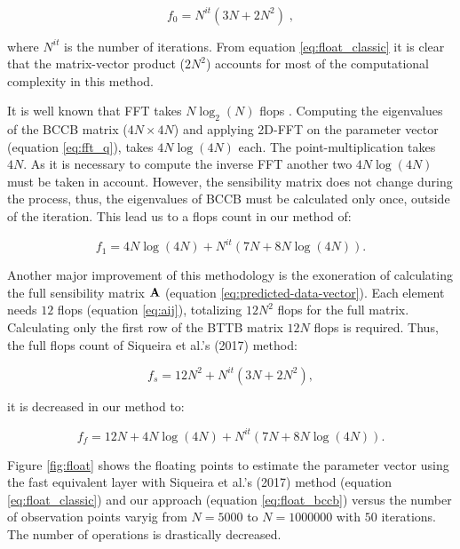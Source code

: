 \documentclass[paper]{geophysics}
\begin{document}
\begin{equation}
f_0 = N^{it} (3N + 2N^2) \; ,
\label{eq:float_classic}
\end{equation}

\noindent where $N^{it}$ is the number of iterations. From equation \ref{eq:float_classic} it is clear that the matrix-vector product ($2N^2$) accounts for most of the computational complexity in this method.

It is well known that FFT takes $N \log_2(N)$ flops \cite[]{brigham1988fast}. Computing the eigenvalues of the BCCB matrix ($4N \times 4N$) and applying 2D-FFT on the parameter vector (equation \ref{eq:fft_q}), takes $4N \log(4N)$ each. The point-multiplication takes $4N$. As it is necessary to compute the inverse FFT another two $4N \log(4N)$ must be taken in account. However, the sensibility matrix does not change during the process, thus, the eigenvalues of BCCB must be calculated only once, outside of the iteration. This lead us to a flops count in our method of:

\begin{equation}
f_1 = 4N\log(4N) + N^{it} (7N + 8N\log(4N)).
\label{eq:float_bccb}
\end{equation}

Another major improvement of this methodology is the exoneration of calculating the full sensibility matrix $\tensor{A}$ (equation \ref{eq:predicted-data-vector}). Each element needs $12$ flops (equation \ref{eq:aij}), totalizing $12N^2$ flops for the full matrix. Calculating only the first row of the BTTB matrix $12N$ flops is required.
Thus, the full flops count of Siqueira et al.'s (2017) method:

\begin{equation}
f_s = 12N^2 + N^{it} (3N + 2N^2),
\label{eq:float_siqueira}
\end{equation}

it is decreased in our method to:

\begin{equation}
f_f = 12N + 4N \log(4N) + N^{it} (7N + 8N\log(4N)).
\label{eq:float_new}
\end{equation}

Figure \ref{fig:float} shows the floating points to estimate the parameter vector using the fast equivalent layer with Siqueira et al.'s (2017) method (equation \ref{eq:float_classic}) and our approach (equation \ref{eq:float_bccb}) versus the number of observation points varyig from $N = 5000$ to $N = 1000000$ with $50$ iterations. The number of operations is drastically decreased.
\end{document}
